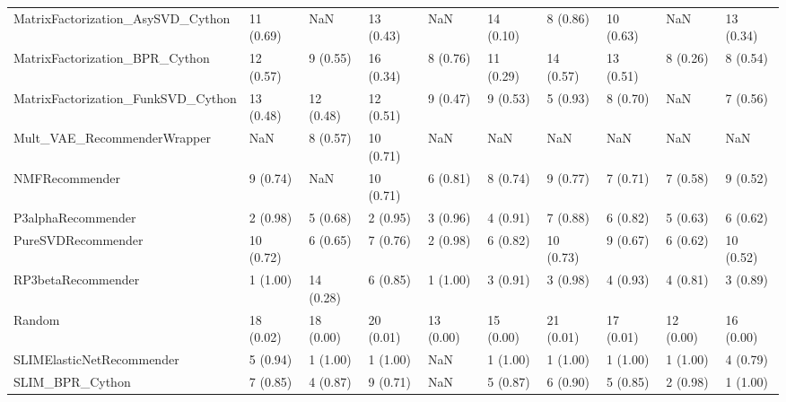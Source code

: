 \begin{tabular}{llllllllll}
  MatrixFactorization\_AsySVD\_Cython &                11 (0.69) &         NaN &     13 (0.43) &          NaN &            14 (0.10) &            8 (0.86) &         10 (0.63) &                NaN &         13 (0.34) \\
     MatrixFactorization\_BPR\_Cython &                12 (0.57) &    9 (0.55) &     16 (0.34) &     8 (0.76) &            11 (0.29) &           14 (0.57) &         13 (0.51) &           8 (0.26) &          8 (0.54) \\
 MatrixFactorization\_FunkSVD\_Cython &                13 (0.48) &   12 (0.48) &     12 (0.51) &     9 (0.47) &             9 (0.53) &            5 (0.93) &          8 (0.70) &                NaN &          7 (0.56) \\
        Mult\_VAE\_RecommenderWrapper &                      NaN &    8 (0.57) &     10 (0.71) &          NaN &                  NaN &                 NaN &               NaN &                NaN &               NaN \\
                     NMFRecommender &                 9 (0.74) &         NaN &     10 (0.71) &     6 (0.81) &             8 (0.74) &            9 (0.77) &          7 (0.71) &           7 (0.58) &          9 (0.52) \\
                 P3alphaRecommender &                 2 (0.98) &    5 (0.68) &      2 (0.95) &     3 (0.96) &             4 (0.91) &            7 (0.88) &          6 (0.82) &           5 (0.63) &          6 (0.62) \\
                 PureSVDRecommender &                10 (0.72) &    6 (0.65) &      7 (0.76) &     2 (0.98) &             6 (0.82) &           10 (0.73) &          9 (0.67) &           6 (0.62) &         10 (0.52) \\
                 RP3betaRecommender &                 1 (1.00) &   14 (0.28) &      6 (0.85) &     1 (1.00) &             3 (0.91) &            3 (0.98) &          4 (0.93) &           4 (0.81) &          3 (0.89) \\
                             Random &                18 (0.02) &   18 (0.00) &     20 (0.01) &    13 (0.00) &            15 (0.00) &           21 (0.01) &         17 (0.01) &          12 (0.00) &         16 (0.00) \\
          SLIMElasticNetRecommender &                 5 (0.94) &    1 (1.00) &      1 (1.00) &          NaN &             1 (1.00) &            1 (1.00) &          1 (1.00) &           1 (1.00) &          4 (0.79) \\
                    SLIM\_BPR\_Cython &                 7 (0.85) &    4 (0.87) &      9 (0.71) &          NaN &             5 (0.87) &            6 (0.90) &          5 (0.85) &           2 (0.98) &          1 (1.00) \\

\end{tabular}
